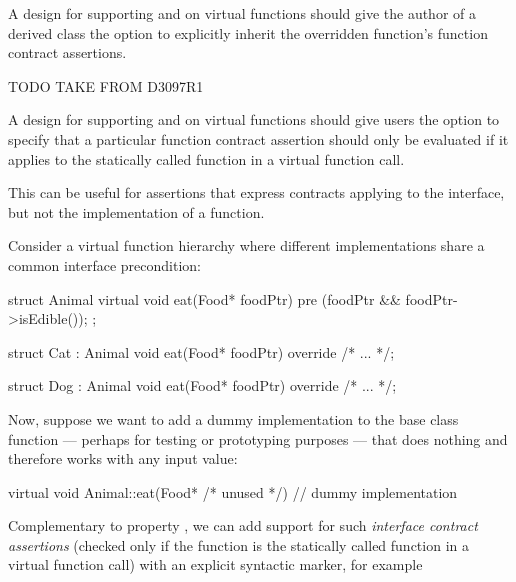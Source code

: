 A design for supporting  and  on virtual functions should give the author of a derived class the option to explicitly inherit the overridden function's function contract assertions.



TODO TAKE FROM D3097R1


A design for supporting  and  on virtual functions should give users the option to specify that a particular function contract assertion should only be evaluated if it applies to the statically called function in a virtual function call.

This can be useful for assertions that express contracts applying to the interface, but not the implementation of a function.

Consider a virtual function hierarchy where different implementations share a common interface
precondition:

\begin{codeblock}
struct Animal {
  virtual void eat(Food* foodPtr)
    pre (foodPtr && foodPtr->isEdible());
};

struct Cat : Animal {
  void eat(Food* foodPtr) override
    /* ... */;
}

struct Dog : Animal {
  void eat(Food* foodPtr) override
    /* ... */;
}
\end{codeblock}

Now, suppose we want to add a dummy implementation to the base class function  --- perhaps for testing or prototyping purposes --- that does nothing and therefore works with any input value:

\begin{codeblock}
virtual void Animal::eat(Food* /* unused */) {
  // dummy implementation
}
\end{codeblock}

Complementary to property , we can add support for such \emph{interface contract assertions} (checked only if the function is the statically called function in a virtual function call) with an explicit syntactic marker, for example

